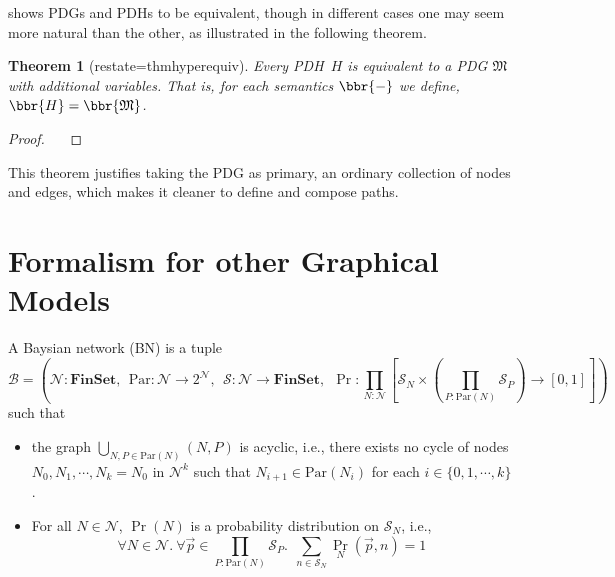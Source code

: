 \documentclass{article}
\theoremstyle{plain}
\newtheorem{theorem}{Theorem}[section]
\theoremstyle{definition}
\theoremstyle{remark}
\newcommand{\todo}[1]{{\color{red}\ \!\Large\smash{\textbf{[}}{\normalsize\textsc{todo:} #1}\ \!\smash{\textbf{]}}}}
\newcommand{\dg}[1]{\mathfrak{#1}}
\newcommand{\MNH}{PDH}
\numberwithin{equation}{section}
\begin{document}
{	 shows PDGs and \MNH s to be equivalent, though in different cases one may seem more natural than the other, as illustrated in the following theorem.
	
	\begin{theorem}[restate=thmhyperequiv]\label{thm:hyperequiv}
		Every \MNH\ $H$ is equivalent to a PDG $\dg M$ with additional variables. That is, for each semantics $\bbr{-}$ we define, $\bbr{H} = \bbr{\dg M}$.
	\end{theorem}
	\begin{proof}
		\todo{}
	\end{proof}
	
	This theorem justifies taking the PDG as primary, an ordinary collection of nodes and edges, which makes it cleaner to define and compose paths. 

	
	\section{Formalism for other Graphical Models}
	\begin{defn}
		A Baysian network (BN) is a tuple
		\[
		\mathcal B = \left(\mathcal N : \mathbf{FinSet}, ~~\mathrm{Par}: \mathcal N \to 2^{\mathcal N},~~ \mathcal S: \mathcal N \to \mathbf{FinSet},~~\Pr: \prod_{N : \mathcal N}  \left[ \mathcal S_N \times \left(\prod_{P : \mathrm{Par}(N)} \mathcal S_P\right)  \to [0,1] \right] \right)
		\]
		such that
		\begin{itemize}[nosep]
			\item the graph $\bigcup_{N, P \in \mathrm{Par}(N)}(N, P)$ is acyclic, i.e., there exists no cycle of nodes $N_0, N_1, \cdots, N_k = N_0$ in $\mathcal N^k$ such that $N_{i+1} \in \mathrm{Par}(N_i)$ for each $i \in \{0, 1, \cdots, k\}$.
			\item For all $N \in \mathcal N$, $\Pr(N)$ is a probability distribution on $\mathcal S_N$, i.e., 
			\[ \forall N\in \mathcal N.~\forall \vec{p} \in {\prod_{P : \mathrm{Par}(N)} \mathcal S_P}.~~ \sum_{n \in \mathcal S_{N}} \Pr_N(\vec{p}, n) = 1\]
		\end{itemize}
	\end{defn}
	
}
\end{document}
